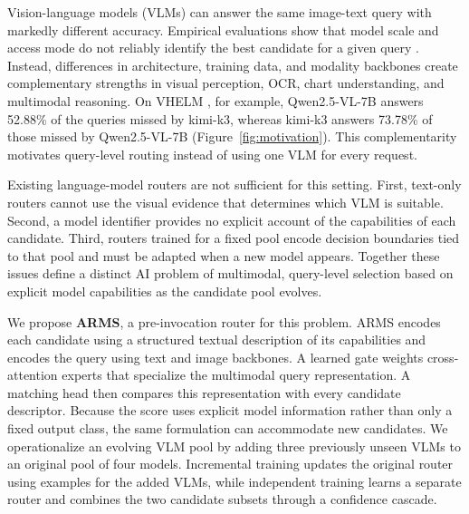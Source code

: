 \documentclass[letterpaper]{article}
\begin{document}
Vision-language models (VLMs) can answer the same image-text query with markedly
different accuracy. Empirical evaluations show that model scale and access mode
do not reliably identify the best candidate for a given query
\citep{VHELM,MARS}. Instead, differences in architecture, training data, and
modality backbones create complementary strengths in visual perception, OCR,
chart understanding, and multimodal reasoning. On VHELM \citep{VHELM}, for
example, Qwen2.5-VL-7B answers 52.88\% of the queries missed by kimi-k3, whereas
kimi-k3 answers 73.78\% of those missed by Qwen2.5-VL-7B (Figure~\ref{fig:motivation}).
This complementarity motivates query-level routing instead of using one VLM for
every request.

Existing language-model routers are not sufficient for this setting. First,
text-only routers cannot use the visual evidence that determines which VLM is
suitable. Second, a model identifier provides no explicit account of
the capabilities of each candidate. Third, routers trained for a fixed pool
encode decision boundaries tied to that pool and must be adapted when a new model
appears.
Together these issues define a distinct AI problem of multimodal,
query-level selection based on explicit model capabilities as the candidate pool
evolves.

We propose \textbf{ARMS}, a pre-invocation router for this problem. ARMS encodes
each candidate using a structured textual description of its capabilities and
encodes the query using text and image backbones. A learned gate weights cross-attention
experts that specialize the multimodal query representation. A matching head
then compares this representation with every candidate descriptor. Because the
score uses explicit model information rather than only a fixed output class,
the same formulation can accommodate new candidates. We operationalize an
evolving VLM pool by adding three
previously unseen VLMs to an original pool of four models. Incremental training
updates the original router using examples for the added VLMs, while independent
training learns a separate router and combines the two candidate subsets through
a confidence cascade.
\end{document}
